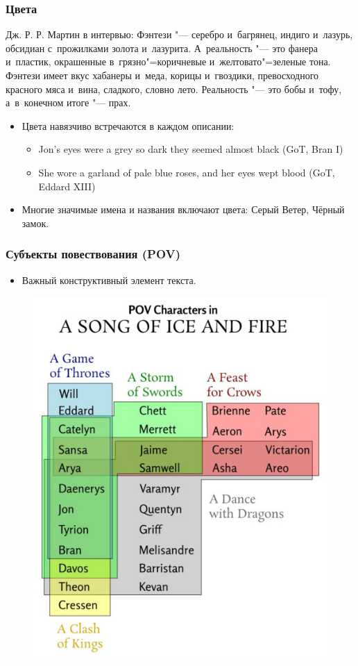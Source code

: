 \documentclass{beamer}
\begin{document}
\begin{frame}
\frametitle{Цвета}

\begin{block}{Дж. Р. Р. Мартин в интервью:}
Фэнтези "--- серебро и~багрянец, индиго и~лазурь, обсидиан с~прожилками золота и~лазурита. А~реальность "--- это фанера и~пластик, окрашенные в~грязно"=коричневые и~желтовато"=зеленые тона. Фэнтези имеет вкус хабанеры и~меда, корицы и~гвоздики, превосходного красного мяса и~вина, сладкого, словно лето. Реальность "--- это бобы и~тофу, а~в~конечном итоге "--- прах.
\end{block}
\begin{itemize}
\item Цвета навязчиво встречаются в каждом описании: 
\begin{itemize}
\item Jon's eyes were a \alert{grey} so dark they seemed almost \alert{black} (GoT, Bran I)
\item She wore a garland of \alert{pale blue} roses, and her eyes wept blood (GoT, Eddard XIII)
\end{itemize}
\item Многие значимые имена и названия включают цвета: Серый Ветер, Чёрный замок.
\end{itemize} 

\end{frame}



\begin{frame}
\frametitle{Субъекты повествования (POV)}

\begin{itemize}
\item Важный конструктивный элемент текста.
\end{itemize} 

\begin{figure}
\includegraphics[width=0.5\linewidth]{POVs}
\end{figure}

\end{frame}
\end{document}
